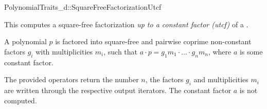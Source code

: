 \begin{ccRefConcept}{PolynomialTraits_d::SquareFreeFactorizationUtcf}

\ccDefinition

This  computes a square-free factorization 
{\em up to a constant factor (utcf)} of a 
. 

A polynomial $p$ is factored into square-free and pairwise coprime non-constant
factors $g_i$ with multiplicities $m_i$, such that 
$a  \cdot  p = g_1m_1  \cdot  ...  \cdot  g_nm_n$, where $a$ is some constant factor. 

The provided operators return the number $n$, the factors $g_i$ and 
multiplicities $m_i$ are written through the respective output iterators.
The constant factor $a$ is not computed.
          
\ccRefines 

\ccTypes

\ccOperations



% 
%          




\ccSeeAlso

\\
\\
\\

\end{ccRefConcept}